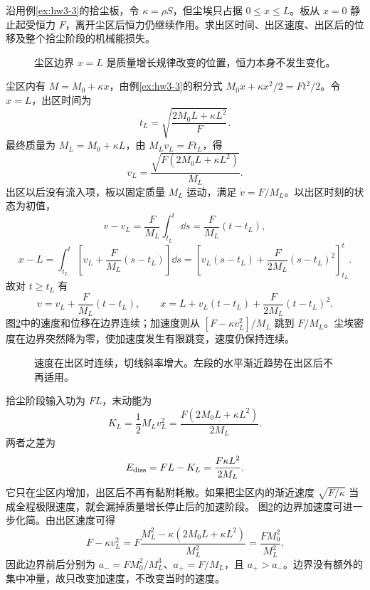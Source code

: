\begin{exercise}[有限尘区与离开后的运动]\label{sup3:problem-exercise-8}\label{sup3:ex:d3-h8}
沿用例\ref{ex:hw3-3}的拾尘板，令 $\kappa=\rho S$，但尘埃只占据 $0\le x\le L$。板从 $x=0$ 静止起受恒力 $F$，离开尘区后恒力仍继续作用。求出区时间、出区速度、出区后的位移及整个拾尘阶段的机械能损失。
\end{exercise}
\begin{figure}[H]\centering
{}
\caption{尘区边界 $x=L$ 是质量增长规律改变的位置，恒力本身不发生变化。}\label{sup3:fig:d3-h8-q}
\end{figure}
\begin{solution}
尘区内有 $M=M_0+\kappa x$，由例\ref{ex:hw3-3}的积分式
$M_0x+\kappa x^2/2=Ft^2/2$。令 $x=L$，出区时间为
\[
t_L=\sqrt{\frac{2M_0L+\kappa L^2}F}.
\]
最终质量为 $M_L=M_0+\kappa L$，由 $M_Lv_L=Ft_L$，得
\[
v_L=\frac{\sqrt{F(2M_0L+\kappa L^2)}}{M_L}.
\]
出区以后没有流入项，板以固定质量 $M_L$ 运动，满足 $\dot v=F/M_L$。以出区时刻的状态为初值，
\[
v-v_L=\frac F{M_L}\int_{t_L}^t\dd s=\frac F{M_L}(t-t_L),
\]
\[
x-L=\int_{t_L}^t\left[v_L+\frac F{M_L}(s-t_L)\right]\dd s
=\left[v_L(s-t_L)+\frac F{2M_L}(s-t_L)^2\right]_{t_L}^t.
\]
故对 $t\ge t_L$ 有
\[
v=v_L+\frac F{M_L}(t-t_L),\qquad
x=L+v_L(t-t_L)+\frac F{2M_L}(t-t_L)^2.
\]
图\ref{sup3:fig:d3-h8-s}中的速度和位移在边界连续；加速度则从
$[F-\kappa v_L^2]/M_L$ 跳到 $F/M_L$。尘埃密度在边界突然降为零，使加速度发生有限跳变，速度仍保持连续。
\begin{figure}[H]\centering
{}
\caption{速度在出区时连续，切线斜率增大。左段的水平渐近趋势在出区后不再适用。}\label{sup3:fig:d3-h8-s}
\end{figure}
拾尘阶段输入功为 $FL$，末动能为
\[
K_L=\frac12M_Lv_L^2
=\frac{F(2M_0L+\kappa L^2)}{2M_L}.
\]
两者之差为
\[
E_{\rm diss}=FL-K_L=\frac{F\kappa L^2}{2M_L}.
\]
它只在尘区内增加，出区后不再有黏附耗散。如果把尘区内的渐近速度 $\sqrt{F/\kappa}$ 当成全程极限速度，就会漏掉质量增长停止后的加速阶段。
图\ref{sup3:fig:d3-h8-s}的边界加速度可进一步化简。由出区速度可得
\[
F-\kappa v_L^2
=F\frac{M_L^2-\kappa(2M_0L+\kappa L^2)}{M_L^2}
=\frac{FM_0^2}{M_L^2}.
\]
因此边界前后分别为 $a_-=FM_0^2/M_L^3$、$a_+=F/M_L$，且 $a_+>a_-$。边界没有额外的集中冲量，故只改变加速度，不改变当时的速度。

\end{solution}


